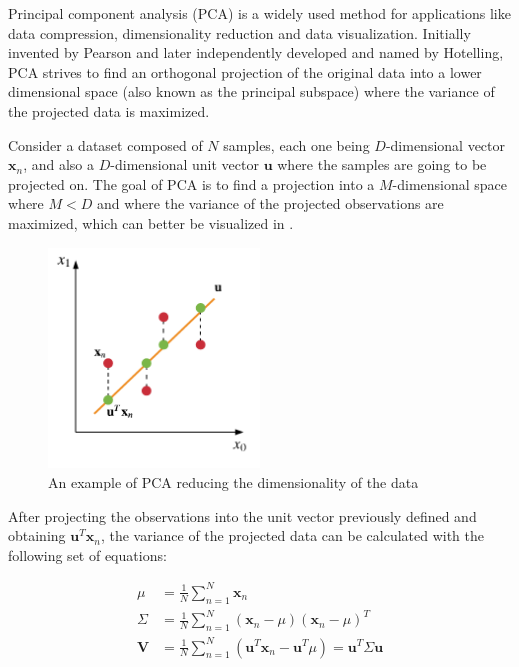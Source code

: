 \documentclass{kththesis}
\begin{document}
Principal component analysis (PCA) is a widely used method for applications like data compression, dimensionality reduction and data visualization. Initially invented by Pearson\citep{pearson1901liii} and later independently developed and named by Hotelling\citep{hotelling1933analysis}, PCA strives to find an orthogonal projection of the original data into a lower dimensional space (also known as the principal subspace) where the variance of the projected data is maximized.

Consider a dataset composed of $N$ samples, each one being $D$-dimensional vector $\mathbf{x}_n$, and also a $D$-dimensional unit vector $\mathbf{u}$ where the samples are going to be projected on. The goal of PCA is to find a projection into a $M$-dimensional space where $M < D$ and where the variance of the projected observations are maximized, which can better be visualized in .

\begin{figure}[h]
    \centering
    \includegraphics[width=0.5\textwidth,keepaspectratio]{figures/pca.pdf}
    \caption{An example of PCA reducing the dimensionality of the data}
    \label{fig:pca}
\end{figure}

After projecting the observations into the unit vector previously defined and obtaining $\mathbf{u}^T\mathbf{x}_n$, the variance of the projected data can be calculated with the following set of equations:

\begin{equation}
\begin{aligned}
\mu &= \frac{1}{N}\sum_{n=1}^N \mathbf{x}_n \\
\Sigma &= \frac{1}{N}\sum_{n=1}^N (\mathbf{x}_n - \mu)(\mathbf{x}_n - \mu)^T \\
\mathbf{V} &= \frac{1}{N}\sum_{n=1}^N (\mathbf{u}^T\mathbf{x}_n - \mathbf{u}^T\mu) = \mathbf{u}^T\Sigma\mathbf{u}
\end{aligned}
\end{equation}
\end{document}
